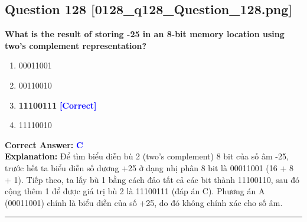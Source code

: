 \documentclass[11pt,a4paper]{article}
\begin{document}
\begin{minipage}{\textwidth}
\subsection*{Question 128 \quad \footnotesize{[0128\_q128\_Question\_128.png]}}
\noindent \textbf{What is the result of storing -25 in an 8-bit memory location using two's complement representation?}

\begin{enumerate}[label=\Alph*.]
    \item 00011001
    \item 00110010
    \item \textbf{11100111} \hfill \textcolor{blue}{\textbf{[Correct]}}
    \item 11110010
\end{enumerate}

\noindent \textbf{Correct Answer:} \textcolor{blue}{\textbf{C}} \\[2pt]
\noindent \textbf{Explanation:} Để tìm biểu diễn bù 2 (two's complement) 8 bit của số âm -25, trước hết ta biểu diễn số dương +25 ở dạng nhị phân 8 bit là 00011001 (16 + 8 + 1). Tiếp theo, ta lấy bù 1 bằng cách đảo tất cả các bit thành 11100110, sau đó cộng thêm 1 để được giá trị bù 2 là 11100111 (đáp án C). Phương án A (00011001) chính là biểu diễn của số +25, do đó không chính xác cho số âm.

\par\vspace{0.3cm}
\hrule
\vspace{0.3cm}
\end{minipage}
\end{document}
